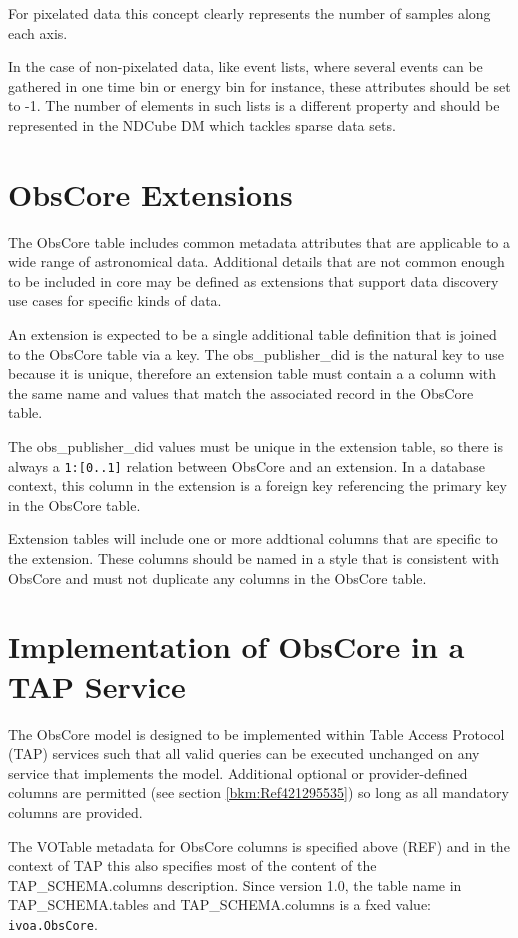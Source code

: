 \documentclass[11pt,a4paper]{ivoa}
\begin{document}
For pixelated data this concept clearly represents the number of samples along each axis.

In the case of non-pixelated data, like event lists, where several events can be gathered in one time bin or energy bin
for instance, these attributes should be set to -1. The number of elements in such lists is a different property and
should be represented in the NDCube DM which tackles sparse data sets.

\section{ObsCore Extensions}
The ObsCore table includes common metadata attributes that are applicable to a wide range of astronomical data.
Additional details that are not common enough to be included in core may be defined as extensions that support
data discovery use cases for specific kinds of data.

An extension is expected to be a single additional table definition that is joined to the ObsCore table via a key.
The obs\_publisher\_did is the natural key to use because it is unique, therefore an extension table must contain a
a column with the same name and values that match the associated record in the ObsCore table.

The obs\_publisher\_did values must be unique in the extension table, so there is always a \verb|1:[0..1]| relation
between ObsCore and an extension. In a database context, this column in the extension is a foreign key referencing
the primary key in the ObsCore table.

Extension tables will include one or more addtional columns that are specific to the extension. These columns should
be named in a style that is consistent with ObsCore and must not duplicate any columns in the ObsCore table.

\section{Implementation of ObsCore in a TAP Service}
\label{sec:obstap-impl}
The ObsCore model is designed to be implemented within Table Access Protocol (TAP) services such that all
valid queries can be executed unchanged on any service that implements the model.  Additional optional or
provider-defined columns are permitted (see section \ref{bkm:Ref421295535}) so long as all mandatory columns are
provided.

The VOTable metadata for ObsCore columns is specified above (REF) and in the context of TAP this also specifies
most of the content of the TAP\_SCHEMA.columns description. Since version 1.0, the table name in TAP\_SCHEMA.tables
and TAP\_SCHEMA.columns is a fxed value: \verb|ivoa.ObsCore|.
\end{document}
